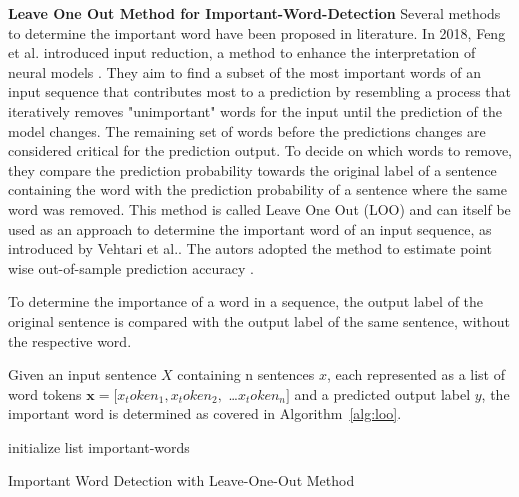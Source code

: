         \textbf{Leave One Out Method for Important-Word-Detection}
            Several methods to determine the important word have been proposed in literature.
            In 2018, Feng et al. introduced input reduction, a method to enhance the interpretation of neural models \cite{feng2018pathologies}. They aim to find a subset of the most important words of an input sequence that contributes most to a prediction by resembling a process that iteratively removes "unimportant" words for the input until the prediction of the model changes. The remaining set of words before the predictions changes are considered critical for the prediction output. To decide on which words to remove, they compare the prediction probability towards the original label of a sentence containing the word with the prediction probability of a sentence where the same word was removed. This method is called Leave One Out (LOO) and can itself be used as an approach to determine the important word of an input sequence, as introduced by Vehtari et al.. The autors adopted the method to estimate point wise out-of-sample prediction accuracy \cite{vehtari2017practical}. 

            To determine the importance of a word in a sequence, the output label of the original sentence is compared with the output label of the same sentence, without the respective word. 
             
            Given an input sentence $X$ containing n sentences $x$, each represented as a list of word tokens ${\textbf{x} = [x_token_1, x_token_2,}$ \dots${x_token_n]}$ and a predicted output label $y$, the important word is determined as covered in Algorithm~\ref{alg:loo}. 

            \IncMargin{1em}
            \begin{algorithm}[H]
            \SetAlgoLined
            \DontPrintSemicolon
            \Indm 
            \Indp
            initialize list important-words\;
            \caption{Important Word Detection with Leave-One-Out Method}
            \label{alg:loo}
            \end{algorithm}
            \DecMargin{1em}

